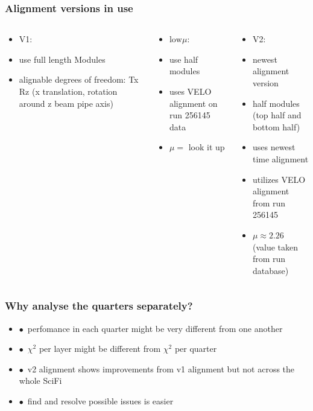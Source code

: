 \documentclass[aspectratio=1610, 12pt]{beamer}
\begin{document}
\begin{frame}\frametitle{Alignment versions in use}
  \begin{columns}
    \begin{column}[c]{0.33\textwidth}
      \begin{itemize}
        \item V1:
        \item use full length Modules
        \item alignable degrees of freedom: Tx Rz (x translation, rotation around z \to beam pipe axis)
      \end{itemize}
    \end{column}
    \begin{column}[c]{0.33\textwidth}
      \begin{itemize}
        \item $\text{low} \mu$:
        \item use half modules
        \item uses VELO alignment on run 256145 data
        \item $\mu =$ look it up
      \end{itemize}
    \end{column}
    \begin{column}[c]{0.33\textwidth}
      \begin{itemize}
        \item V2:
        \item newest alignment version
        \item half modules (top half and bottom half)
        \item uses newest time alignment
        \item utilizes VELO alignment from run 256145
        \item $\mu \approx 2.26$ (value taken from run database)
      \end{itemize}
    \end{column}
  \end{columns}
\end{frame}

\begin{frame}\frametitle{Why analyse the quarters separately?}
  \begin{itemize}
    \item $\bullet$\, perfomance in each quarter might be very different from one another
    \item $\bullet$\, \to $\chi^2$ per layer might be different from $\chi^2$ per quarter
    \item $\bullet$\, v2 alignment shows improvements from v1 alignment but not across the whole SciFi
    \item $\bullet$\, find and resolve possible issues is easier
  \end{itemize}
\end{frame}
\end{document}
